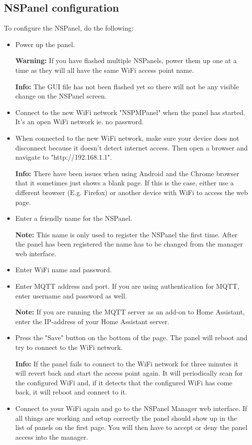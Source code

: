 \documentclass[10pt]{article}
\newcommand{\info}[1]{\begin{infoBox} \textbf{Info:} #1 \end{infoBox}}
\newcommand{\note}[1]{\begin{noteBox} \textbf{Note:} #1 \end{noteBox}}
\newcommand{\warning}[1]{\begin{hintBox} \textbf{Warning:} #1 \end{hintBox}}
\begin{document}
    \subsection{NSPanel configuration}
    \label{sec:nspanel_configuration}
    To configure the NSPanel, do the following:
    \begin{itemize}
      \item Power up the panel.
      \warning{If you have flashed multiple NSPanels, power them up one at a time as they will all have the same WiFi access point name.}
      \info{The GUI file has not been flashed yet so there will not be any visible change on the NSPanel screen.}
      \item Connect to the new WiFi network "NSPMPanel" when the panel has started. It's an open WiFi network ie. no password.
      \item When connected to the new WiFi network, make sure your device does not disconnect because it doesn't detect internet access. Then open a browser and navigate to "http://192.168.1.1".
      \info{There have been issues when using Android and the Chrome browser that it sometimes just shows a blank page. If this is the case, either use a different browser (E.g. Firefox) or another device with WiFi to access the web page.}
      \item Enter a friendly name for the NSPanel.
      \note{This name is only used to register the NSPanel the first time. After the panel has been registered the name has to be changed from the manager web interface.}
      \item Enter WiFi name and password.
      \item Enter MQTT address and port. If you are using authentication for MQTT, enter username and password as well.
      \note{If you are running the MQTT server as an add-on to Home Assistant, enter the IP-address of your Home Assistant server.}
      \item Press the "Save" button on the bottom of the page. The panel will reboot and try to connect to the WiFi network.
      \info{If the panel fails to connect to the WiFi network for three minutes it will revert back and start the access point again. It will periodically scan for the configured WiFi and, if it detects that the configured WiFi has come back, it will reboot and connect to it.}
      \item Connect to your WiFi again and go to the NSPanel Manager web interface. If all things are working and setup correctly the panel should show up in the list of panels on the first page. You will then have to accept or deny the panel access into the manager.

\end{itemize}
\end{document}
